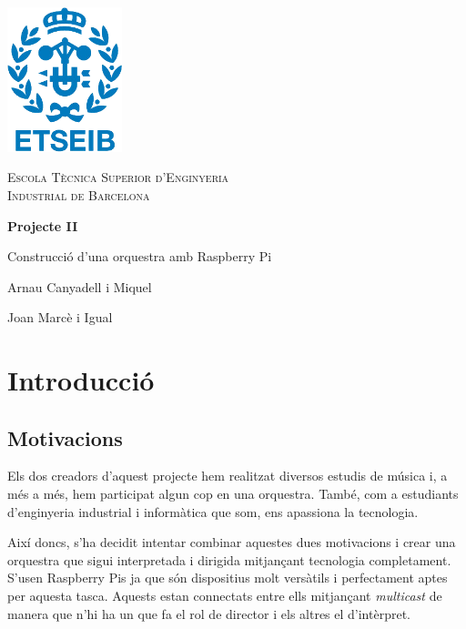 \documentclass[a4paper]{paper}
\let\oldsection\section
\renewcommand\section{\clearpage\oldsection}
\begin{document}
\begin{titlepage}
	\centering
	\vspace{1cm}
	\includegraphics[width=0.25\textwidth]{images/etseib}
	\par\vspace{1cm}
	\textsc{ \LARGE Escola Tècnica Superior d'Enginyeria \\[1em] 
		Industrial de Barcelona}
	\par\vspace{2cm}
	\textbf{\LARGE Projecte II}
	\par\vspace{2cm}
	{\Huge Construcció d'una orquestra amb Raspberry Pi}
	\vfill
	\begin{flushright}
		\large
		Arnau Canyadell i Miquel \par
		Joan Marcè i Igual \par
	\end{flushright}
\end{titlepage}

\tableofcontents

\newpage

\section{Introducció}

\subsection{Motivacions}

Els dos creadors d'aquest projecte hem realitzat diversos estudis de música i, a més a més, hem participat algun cop en una orquestra. També, com a estudiants d'enginyeria industrial i informàtica que som, ens apassiona la tecnologia.

Així doncs, s'ha decidit intentar combinar aquestes dues motivacions i crear una orquestra que sigui interpretada i dirigida mitjançant tecnologia completament. S'usen Raspberry Pis ja que són dispositius molt versàtils i perfectament aptes per aquesta tasca. Aquests estan connectats entre ells mitjançant \emph{multicast} de manera que n'hi ha un que fa el rol de director i els altres el d'intèrpret.
\end{document}
